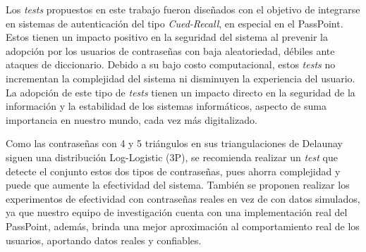 \documentclass[12pt]{report}
\begin{document}
Los \textit{tests} propuestos en este trabajo fueron diseñados con el objetivo de integrarse en sistemas de autenticación del tipo \textit{Cued-Recall}, en especial en el PassPoint. Estos tienen un impacto positivo en la seguridad del sistema al prevenir la adopción por los usuarios de contraseñas con baja aleatoriedad, débiles ante ataques de diccionario. Debido a su bajo costo computacional, estos \textit{tests} no incrementan la complejidad del sistema ni disminuyen la experiencia del usuario. La adopción de este tipo de \textit{tests} tienen un impacto directo en la seguridad de la información y la estabilidad de los sistemas informáticos, aspecto de suma importancia en nuestro mundo, cada vez más digitalizado.


Como las contraseñas con 4 y 5 triángulos en sus triangulaciones de Delaunay siguen una distribución Log-Logistic (3P), se recomienda realizar  un \textit{test} que detecte el conjunto estos dos tipos de contraseñas, pues ahorra complejidad y puede que aumente la efectividad del sistema. También se proponen realizar los experimentos de efectividad con contraseñas reales en vez de con datos simulados, ya que nuestro equipo de investigación cuenta con una implementación real del PassPoint, además, brinda una mejor aproximación al comportamiento real de los usuarios, aportando datos reales y confiables.
\end{document}
